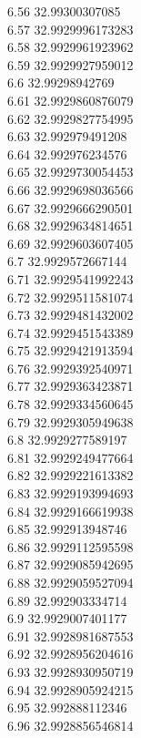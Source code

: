 {6.56	32.99300307085\\
6.57	32.9929996173283\\
6.58	32.9929961923962\\
6.59	32.9929927959012\\
6.6	32.99298942769\\
6.61	32.9929860876079\\
6.62	32.9929827754995\\
6.63	32.992979491208\\
6.64	32.992976234576\\
6.65	32.9929730054453\\
6.66	32.9929698036566\\
6.67	32.9929666290501\\
6.68	32.9929634814651\\
6.69	32.9929603607405\\
6.7	32.9929572667144\\
6.71	32.9929541992243\\
6.72	32.9929511581074\\
6.73	32.9929481432002\\
6.74	32.9929451543389\\
6.75	32.9929421913594\\
6.76	32.9929392540971\\
6.77	32.9929363423871\\
6.78	32.9929334560645\\
6.79	32.9929305949638\\
6.8	32.9929277589197\\
6.81	32.9929249477664\\
6.82	32.9929221613382\\
6.83	32.9929193994693\\
6.84	32.9929166619938\\
6.85	32.992913948746\\
6.86	32.9929112595598\\
6.87	32.9929085942695\\
6.88	32.9929059527094\\
6.89	32.992903334714\\
6.9	32.9929007401177\\
6.91	32.9928981687553\\
6.92	32.9928956204616\\
6.93	32.9928930950719\\
6.94	32.9928905924215\\
6.95	32.992888112346\\
6.96	32.9928856546814\\
}

